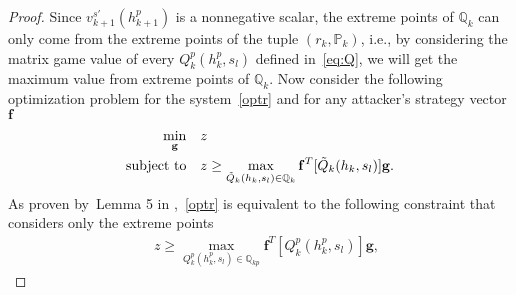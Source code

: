 \begin{proof}
\iffalse
The backup matrix set $\mathbb{Q}_{k}$ for all possible $h_{k}$ is %
\begin{align*}
\{&\tilde{Q}_{k}(h_{k},s_{l})=\tilde{r}_{k}(h_{k},s_{l})+\sum_{s'\in S}\tilde{P}_{k}(s'|h_{k},s_{l})v^{s'}_{k+1}(h_{k+1}^{p})\},
\end{align*}
\fi
Since $v^{s'}_{k+1}(h_{k+1}^{p})$ is a nonnegative scalar, the extreme points of $\mathbb{Q}_{k}$ can only come from the extreme points of the tuple $(r_{k}, \mathbb{P}_{k})$, i.e., by considering the matrix game value of every $Q_{k}^{p} (h_{k}^{p},s_{l})$ defined in~\eqref{eq:Q}, we will get the maximum value from extreme points of $\mathbb{Q}_k$. 
% 
Now consider the following optimization problem for the system~\eqref{optr} and for any attacker's strategy vector $\mathbf{f}$
\vspace{-5pt}
\begin{align}
\vspace{-5pt}
\min_{\mathbf{g}} \quad & z\label{ob_z}\\
\text{subject to}\quad &z \geq \max_{\tilde{Q}_{k}(h_{k},s_{l})\in \mathbb{Q}_{k}}\mathbf{f}^{T} [\tilde{Q}_{k}(h_{k},s_{l})]\mathbf{g}.
\label{optr}
\end{align}
As proven by~Lemma 5 in \cite{RGT},~\eqref{optr} is equivalent to the following constraint that considers only the extreme points
\begin{align}
\quad z \geq \max_{Q_{k}^{p}(h^{p}_{k},s_{l})\in \mathbb{Q}_{kp}}\mathbf{f}^{T} [Q_{k}^{p}(h^{p}_{k},s_{l})]\mathbf{g},
\end{align}



\end{proof}
